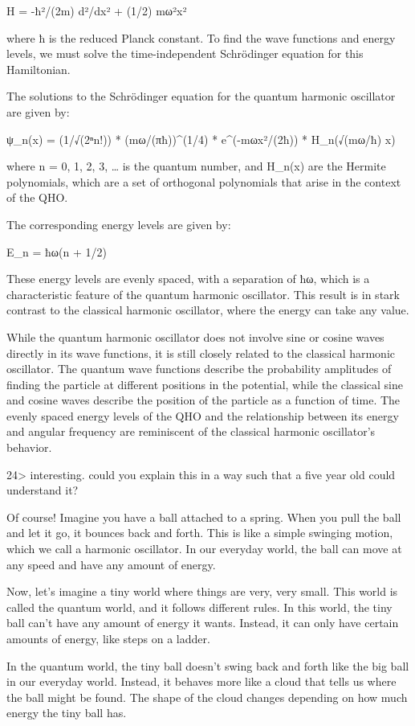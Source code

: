 \documentclass[
]{article}
\begin{document}
H = -ħ²/(2m) d²/dx² + (1/2) mω²x²

where ħ is the reduced Planck constant. To find the wave functions and
energy levels, we must solve the time-independent Schrödinger equation
for this Hamiltonian.

The solutions to the Schrödinger equation for the quantum harmonic
oscillator are given by:

ψ\_n(x) = (1/√(2ⁿn!)) * (mω/(πħ))\^{}(1/4) * e\^{}(-mωx²/(2ħ)) *
H\_n(√(mω/ħ) x)

where n = 0, 1, 2, 3, \ldots{} is the quantum number, and H\_n(x) are
the Hermite polynomials, which are a set of orthogonal polynomials that
arise in the context of the QHO.

The corresponding energy levels are given by:

E\_n = ħω(n + 1/2)

These energy levels are evenly spaced, with a separation of ħω, which is
a characteristic feature of the quantum harmonic oscillator. This result
is in stark contrast to the classical harmonic oscillator, where the
energy can take any value.

While the quantum harmonic oscillator does not involve sine or cosine
waves directly in its wave functions, it is still closely related to the
classical harmonic oscillator. The quantum wave functions describe the
probability amplitudes of finding the particle at different positions in
the potential, while the classical sine and cosine waves describe the
position of the particle as a function of time. The evenly spaced energy
levels of the QHO and the relationship between its energy and angular
frequency are reminiscent of the classical harmonic oscillator's
behavior.

24\textgreater{} interesting. could you explain this in a way such that
a five year old could understand it?

Of course! Imagine you have a ball attached to a spring. When you pull
the ball and let it go, it bounces back and forth. This is like a simple
swinging motion, which we call a harmonic oscillator. In our everyday
world, the ball can move at any speed and have any amount of energy.

Now, let's imagine a tiny world where things are very, very small. This
world is called the quantum world, and it follows different rules. In
this world, the tiny ball can't have any amount of energy it wants.
Instead, it can only have certain amounts of energy, like steps on a
ladder.

In the quantum world, the tiny ball doesn't swing back and forth like
the big ball in our everyday world. Instead, it behaves more like a
cloud that tells us where the ball might be found. The shape of the
cloud changes depending on how much energy the tiny ball has.
\end{document}
